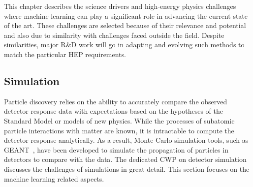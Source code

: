 

This chapter describes the science drivers and high-energy physics challenges where machine learning can play a significant role in advancing the current state of the art.
These challenges are selected because of their relevance and potential and also due to similarity with challenges faced outside the field.
Despite similarities, major R\&D work will go in adapting and evolving such methods to match the particular HEP requirements.


\subsection{Simulation}
\label{sec:fast-simulation}

Particle discovery relies on the ability to accurately compare the observed detector response data with expectations based on the hypotheses of the Standard Model or models of new physics.
While the processes of subatomic particle interactions with matter are known, it is intractable to compute the detector response analytically.
As a result, Monte Carlo simulation tools, such as GEANT~\cite{GEANT4}, have been developed to simulate the propagation of particles in detectors to compare with the data.
The dedicated CWP on detector simulation~\cite{simulationCWP} discusses the challenges of simulations in great detail.
This section focuses on the machine learning related aspects.\\

